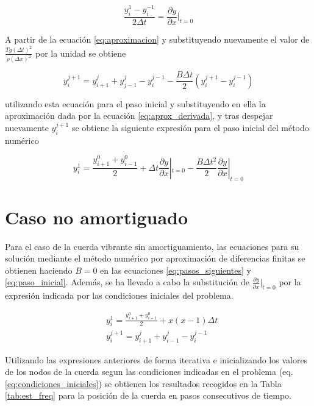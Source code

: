 \documentclass[11pt]{article}
\begin{document}
\begin{equation}
\frac{y^1_i - y^{-1}_i}{2\Delta{t}} = \frac{\partial{y}}{\partial{x}}|_{t=0}
\label{eq:aprox_derivada}
\end{equation}

A partir de la ecuación \ref{eq:aproximacion} y substituyendo nuevamente el valor de 
$\frac{Tg(\Delta{t})^2}{\rho(\Delta{x})^2}$ por la unidad se obtiene

\begin{equation}
y^{j+1}_i = y^{j}_{i+1} + y^{j}_{j-1} - y^{j-1}_i - \frac{B\Delta{t}}{2}(y^{j+1}_i - y^{j-1}_i)
\end{equation}

utilizando esta ecuación para el paso inicial y substituyendo en ella la aproximación dada
por la ecuación \ref{eq:aprox_derivada}, y tras despejar nuevamente $y^{j+1}_i$ se obtiene
la siguiente expresión para el paso inicial del método numérico

\begin{equation}
y^1_i = \frac{y^0_{i+1} + y^0_{i-1}}{2} + \Delta{t}\frac{\partial{y}}{\partial{x}}|_{t=0}
	- \frac{B\Delta{t}^2}{2}\frac{\partial{y}}{\partial{x}}|_{t=0}
\label{eq:paso_inicial}
\end{equation}

\section{Caso no amortiguado}
Para el caso de la cuerda vibrante sin amortiguamiento, las ecuaciones para su
solución mediante el método numérico por aproximación de diferencias finitas se obtienen
haciendo $B=0$ en las ecuaciones \ref{eq:pasos_siguientes} y \ref{eq:paso_inicial}. Además,
se ha llevado a cabo la substitución de $\frac{\partial{y}}{\partial{x}}|_{t=0}$ por la
expresión indicada por las condiciones iniciales del problema.

\begin{subequations}
\begin{flalign}
	&y^1_i = \frac{y^0_{i+1} + y^0_{i-1}}{2} + x(x-1)\Delta{t}\\
	&y^{j+1}_i = y^j_{i+1} + y^j_{i-1} - y^{j-1}_i
\end{flalign}
\end{subequations}

Utilizando las expresiones anteriores de forma iterativa e inicializando los valores de
los nodos de la cuerda segun las condiciones indicadas en el problema
(eq. \ref{eq:condiciones_iniciales}) se obtienen los resultados recogidos en la Tabla 
\ref{tab:est_freq} para la posición de la cuerda en pasos consecutivos de tiempo. 
\end{document}
